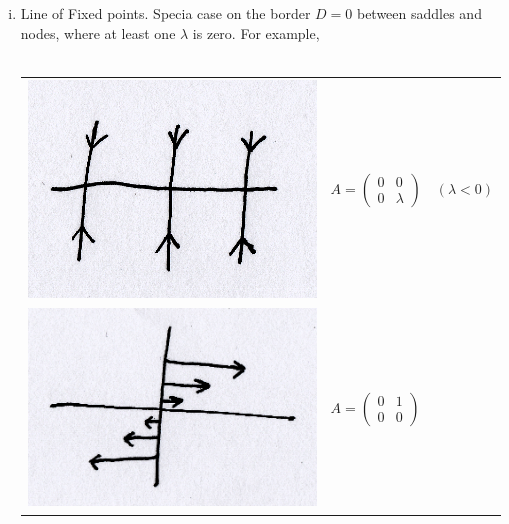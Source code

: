 \documentclass{article}
\begin{document}
\begin{enumerate}[(i)]
\item Line of Fixed points. Specia case on the border $D=0$ between saddles and
nodes, where at least one $\lambda$ is zero. For example, 
\\
\\
\begin{tabular}{ m{4.5cm} m{8cm}  } 
\includegraphics[scale = 0.15]{fig12.png}  & 
$ A = \left( \begin{array}{cc}
		0 & 0 \\
		 0 & \lambda \end{array} \right)   \quad(\lambda < 0) $ \\
\includegraphics[scale = 0.15]{fig13.png}  & 
$ A = \left( \begin{array}{cc}
		0 & 1 \\
		 0 & 0 \end{array} \right)  $ 
\end{tabular}
\end{enumerate}
\end{document}
